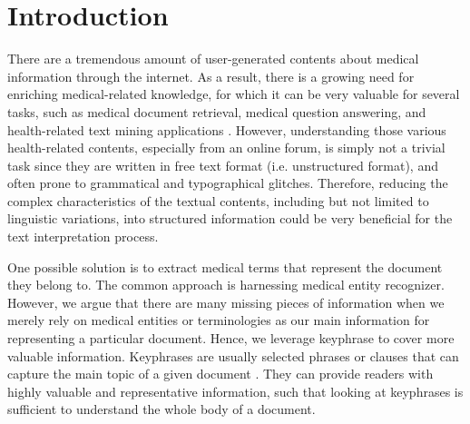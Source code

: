 \section{Introduction}
There are a tremendous amount of user-generated contents about medical information through the internet. As a result, there is a growing need for enriching medical-related knowledge, for which it can be very valuable for several tasks, such as medical document retrieval, medical question answering, and health-related text mining applications \cite{cao2010automatically}. However, understanding those various health-related contents, especially from an online forum, is simply not a trivial task since they are written in free text format (i.e. unstructured format), and often prone to grammatical and typographical glitches. Therefore, reducing the complex characteristics of the textual contents, including but not limited to linguistic variations, into structured information could be very beneficial for the text interpretation process. 

One possible solution is to extract medical terms that represent the document they belong to. The common approach is harnessing medical entity recognizer. However, we argue that there are many missing pieces of information when we merely rely on medical entities or terminologies as our main information for representing a particular document. Hence, we leverage keyphrase to cover more valuable information. Keyphrases are usually selected phrases or clauses that can capture the main topic of a given document \cite{turney2000learning}. They can provide readers with highly valuable and representative information, such that looking at keyphrases is sufficient to understand the whole body of a document.

